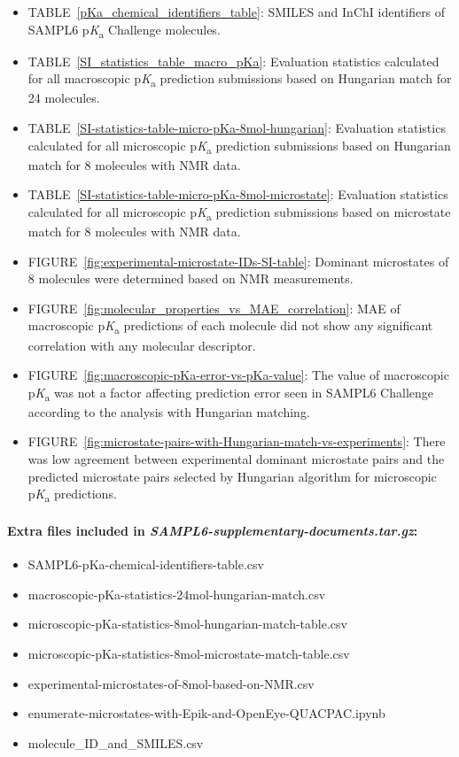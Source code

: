 \documentclass[9pt,lineno,final]{elife}
\newcommand{\pKa}{p\textit{K}\textsubscript{a}}
\begin{document}
\begin{itemize}
\item TABLE~\ref{pKa_chemical_identifiers_table}: SMILES and InChI identifiers of SAMPL6 \pKa{}  Challenge molecules.
\item TABLE~\ref{SI_statistics_table_macro_pKa}: Evaluation statistics calculated for all macroscopic \pKa{} prediction submissions based on Hungarian match for 24 molecules.
\item TABLE~\ref{SI-statistics-table-micro-pKa-8mol-hungarian}: Evaluation statistics calculated for all microscopic \pKa{} prediction submissions based on Hungarian match for 8 molecules with NMR data.
\item TABLE~\ref{SI-statistics-table-micro-pKa-8mol-microstate}: Evaluation statistics calculated for all microscopic \pKa{} prediction submissions based on microstate match for 8 molecules with NMR data.
\item FIGURE~\ref{fig:experimental-microstate-IDs-SI-table}: Dominant microstates of 8 molecules were determined based on NMR measurements.
\item FIGURE~\ref{fig:molecular_properties_vs_MAE_correlation}: MAE of macroscopic \pKa{} predictions of each molecule did not show any significant correlation with any molecular descriptor.
\item FIGURE~\ref{fig:macroscopic-pKa-error-vs-pKa-value}: The value of macroscopic \pKa{} was not a factor affecting prediction error seen in SAMPL6 Challenge according to the analysis with Hungarian matching.
\item FIGURE~\ref{fig:microstate-pairs-with-Hungarian-match-vs-experiments}: There was low agreement between experimental dominant microstate pairs and the predicted microstate pairs selected by Hungarian algorithm for microscopic \pKa{} predictions. 




\end{itemize}

\paragraph{Extra files included in \textit{SAMPL6-supplementary-documents.tar.gz}:}  
\begin{itemize}
\item SAMPL6-pKa-chemical-identifiers-table.csv 
\item macroscopic-pKa-statistics-24mol-hungarian-match.csv
\item microscopic-pKa-statistics-8mol-hungarian-match-table.csv
\item microscopic-pKa-statistics-8mol-microstate-match-table.csv
\item experimental-microstates-of-8mol-based-on-NMR.csv
\item enumerate-microstates-with-Epik-and-OpenEye-QUACPAC.ipynb
\item molecule\_ID\_and\_SMILES.csv
\end{itemize}
\end{document}
